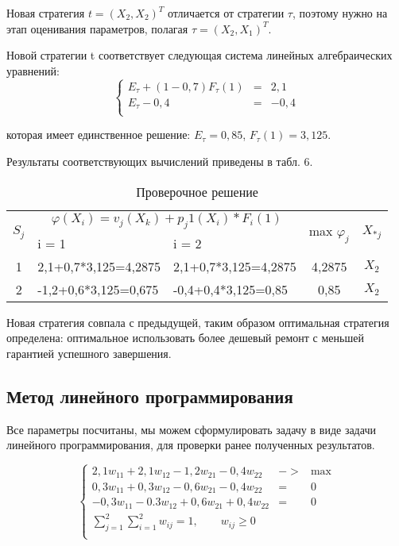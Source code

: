 Новая стратегия $t = (X_2, X_2)^T$ отличается от стратегии $\tau$, поэтому нужно на этап оценивания параметров, полагая $\tau = (X_2, X_1)^T$.

Новой стратегии t соответствует следующая система линейных алгебраических уравнений:
$$
\left\{
	\begin{aligned}
	E_\tau + (1 - 0,7) F_\tau(1) &= & 2,1\\
	E_\tau - 0,4 &= & -0,4\\
	\end{aligned}
\right.
$$

которая имеет единственное решение: $E_\tau = 0,85$, $F_\tau(1) = 3,125$.

Результаты соответствующих вычислений приведены в табл. 6.

\begin{table}[htb]
	\begin{tabularx}{\textwidth}{|c|X|X|c|c|}
	\hline
	\multirow{2}{*}{$S_j$} & \multicolumn{2}{c|}{$\varphi (X_i )=v_j (X_k )+p_j1 (X_i)*F_i (1)$} & \multirow{2}{*}{max $\varphi_j$} & \multirow{2}{*}{$X_{*j}$} \\ 
	\hhline{~--~~}
	{} & i = 1 & i = 2 & {} & {} \\
	\hline
	1 & 2,1+0,7*3,125=4,2875 & 2,1+0,7*3,125=4,2875 & 4,2875 & $X_2$ \\
	\hline
	2 & -1,2+0,6*3,125=0,675 & -0,4+0,4*3,125=0,85 & 0,85 & $X_2$ \\
	\hline
	\end{tabularx}
\caption{Проверочное решение}
\end{table}

Новая стратегия совпала с предыдущей, таким образом оптимальная стратегия определена: оптимальное использовать более дешевый ремонт с меньшей гарантией успешного завершения.

\subsection{Метод линейного программирования}

Все параметры посчитаны, мы можем сформулировать задачу в виде задачи линейного программирования, для проверки ранее полученных результатов.

$$
\left\{
	\begin{aligned}
	2,1w_{11}+2,1w_{12}-1,2w_{21}-0,4w_{22} & ->& \text{max}\\
	0,3w_{11}+0,3w_{12}-0,6w_{21}-0,4w_{22} & = & 0 \\
	-0,3w_{11}-0.3w_{12}+0,6w_{21}+0,4w_{22} & = & 0 \\
	\sum\limits_{j=1}^2 \sum\limits_{i=1}^2 w_{ij}=1,\qquad w_{ij} \geq 0 &&\\
	\end{aligned}
\right.
$$

